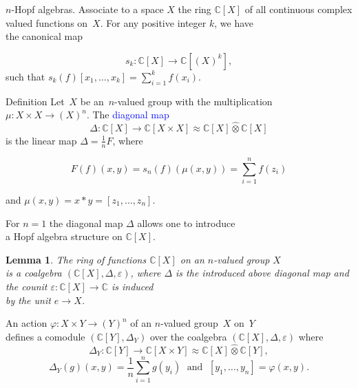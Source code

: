 \documentclass{beamer}
\newtheorem{lem}{Lemma}
\def\blue#1{\textcolor{blue}{#1}}
\begin{document}
\begin{frame}{$n$-Hopf algebras.}
Associate to a space $X$ the ring $\mathbb{C}[X]$ of all continuous complex valued functions on~$X$.
For any positive integer $k$, we have\\ the canonical map
\vspace{-0.4cm}

\[
s_k : \mathbb{C}[X] \longrightarrow \mathbb{C}[(X)^k],
\]
such that  $s_k(f)[x_1, \ldots,x_k] = \sum_{i=1}^k f(x_i)$.
\begin{block}{Definition}
Let~$X$ be an~$n$-valued group with the multiplication
$\mu : X \times X \longrightarrow (X)^n$.\; The \blue{diagonal map}
\[
\Delta : \mathbb{C}[X] \longrightarrow \mathbb{C}[X \times X]
\approx \mathbb{C}[X] \widehat{\otimes} \mathbb{C}[X]
\]
is the linear map $\Delta = \frac{1}{n}F$, where
\vspace{-0.5cm}

\[
F(f)(x,y) = s_n(f)(\mu(x,y)) = \sum_{i=1}^n f(z_i)
\]
\vspace{-0.5cm}

and $\mu(x,y) = x*y = [z_1, \ldots, z_n]$.
\end{block}
\end{frame}




\begin{frame}{}
For $n=1$ the diagonal map $\Delta$ allows one to introduce\\ a Hopf algebra structure on $\mathbb{C}[X]$.
\begin{lem}
The ring of functions $\mathbb{C}[X]$ on an $n$-valued group $X$\\ is a coalgebra $(\mathbb{C}[X],\Delta,\varepsilon)$, where
$\Delta$ is the introduced above diagonal map and the counit $\varepsilon : \mathbb{C}[X] \to \mathbb{C}$ is induced\\ by the unit $e \to X$.
\end{lem}
An action $\varphi : X \times Y \to (Y)^n$ of an $n$-valued group~$X$ on~$Y$\\
defines a comodule $(\mathbb{C}[Y],\Delta_Y)$ over the coalgebra $(\mathbb{C}[X],\Delta,\varepsilon)$ where
\[
\Delta_Y : \mathbb{C}[Y] \longrightarrow \mathbb{C}[X \times Y] \approx \mathbb{C}[X] \widehat{\otimes} \mathbb{C}[Y],
\]
\[
\Delta_Y(g)(x,y) = \frac{1}{n}\sum_{i=1}^n g(y_i)\; \text{ and }\; [y_1, \ldots, y_n]= \varphi(x,y).
\]
\end{frame}
\end{document}
